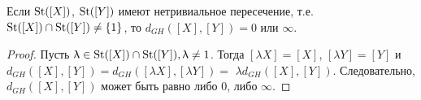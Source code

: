 \begin{corollary*}
	Если $\operatorname{St}([X])$, $\operatorname{St}([Y])$ имеют нетривиальное пересечение, т.е. $\operatorname{St}([X])\cap \operatorname{St}([Y]) \neq \{1\}$, то $d_{GH}([X], [Y]) = 0$ или $\infty$.
\end{corollary*}
\begin{proof}
	         Пусть $\uplambda \in \operatorname{St}([X])\cap \operatorname{St}([Y]), \uplambda \neq 1$. Тогда $[\lambda X] = [X]$, $[\lambda Y] = [Y]$ и $d_{GH}([X], [Y]) = d_{GH}([\lambda X], [\lambda Y]) =$ $ \lambda d_{GH}([X], [Y])$. Следовательно, $d_{GH}([X], [Y])$ может быть равно либо $0$, либо $\infty$.
\end{proof}

